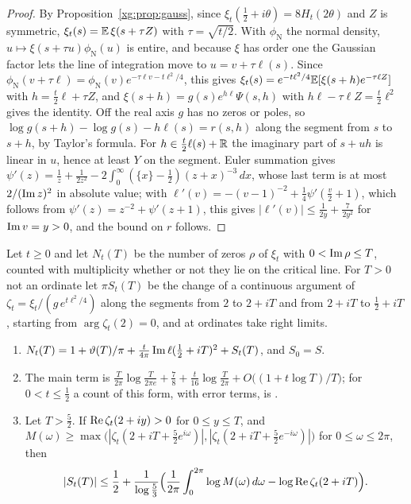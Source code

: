 \begin{proof}
By Proposition~\ref{xg:prop:gauss}, since $\xi_t(\frac12+i\theta)=8H_t(2\theta)$ and $Z$ is symmetric, $\xi_t(s)=\mathbb{E}\,\xi(s+\tau Z)$ with $\tau=\sqrt{t/2}$. With $\phi_{\mathrm N}$ the normal density, $u\mapsto\xi(s+\tau u)\phi_{\mathrm N}(u)$ is entire, and because $\xi$ has order one the Gaussian factor lets the line of integration move to $u=v+\tau\ell(s)$. Since $\phi_{\mathrm N}(v+\tau\ell)=\phi_{\mathrm N}(v)e^{-\tau\ell v-t\ell^2/4}$, this gives $\xi_t(s)=e^{-t\ell^2/4}\mathbb{E}[\xi(s+h)e^{-\tau\ell Z}]$ with $h=\frac t2\ell+\tau Z$, and $\xi(s+h)=g(s)e^{h\ell}\Psi(s,h)$ with $h\ell-\tau\ell Z=\frac t2\ell^2$ gives the identity. Off the real axis $g$ has no zeros or poles, so $\log g(s+h)-\log g(s)-h\ell(s)=r(s,h)$ along the segment from $s$ to $s+h$, by Taylor's formula. For $h\in\frac t2\ell(s)+\mathbb{R}$ the imaginary part of $s+uh$ is linear in $u$, hence at least $Y$ on the segment. Euler summation gives $\psi'(z)=\frac1z+\frac1{2z^2}-2\int_0^\infty(\{x\}-\frac12)(z+x)^{-3}\,dx$, whose last term is at most $2/(\operatorname{Im} z)^2$ in absolute value; with $\ell'(v)=-(v-1)^{-2}+\frac14\psi'(\frac v2+1)$, which follows from $\psi'(z)=z^{-2}+\psi'(z+1)$, this gives $|\ell'(v)|\le\frac1{2y}+\frac7{2y^2}$ for $\operatorname{Im} v=y>0$, and the bound on $r$ follows.
\end{proof}

\begin{proposition}\label{cp:prop:count}
Let $t\ge0$ and let $N_t(T)$ be the number of zeros $\rho$ of $\xi_t$ with $0<\operatorname{Im}\rho\le T$, counted with multiplicity whether or not they lie on the critical line. For $T>0$ not an ordinate let $\pi S_t(T)$ be the change of a continuous argument of $\zeta_t=\xi_t/(g\,e^{t\ell^2/4})$ along the segments from $2$ to $2+iT$ and from $2+iT$ to $\frac12+iT$, starting from $\arg\zeta_t(2)=0$, and at ordinates take right limits.
\begin{enumerate}
\item[(i)] $N_t(T)=1+\vartheta(T)/\pi+\frac t{4\pi}\operatorname{Im}\ell(\frac12+iT)^2+S_t(T)$, and $S_0=S$.
\item[(ii)] The main term is $\frac T{2\pi}\log\frac T{2\pi e}+\frac78+\frac t{16}\log\frac T{2\pi}+O\big((1+t\log T)/T\big)$; for $0<t\le\frac12$ a count of this form, with error terms, is \cite[Theorem 1.5]{Polymath}.
\item[(iii)] Let $T>\frac52$. If $\operatorname{Re}\zeta_t(2+iy)>0$ for $0\le y\le T$, and $M(\omega)\ge\max\big(|\zeta_t(2+iT+\frac52e^{i\omega})|,|\zeta_t(2+iT+\frac52e^{-i\omega})|\big)$ for $0\le\omega\le2\pi$, then
\[
|S_t(T)|\le\frac12+\frac1{\log\frac53}\Big(\frac1{2\pi}\int_0^{2\pi}\log M(\omega)\,d\omega-\log\operatorname{Re}\zeta_t(2+iT)\Big).
\]
\end{enumerate}
\end{proposition}

